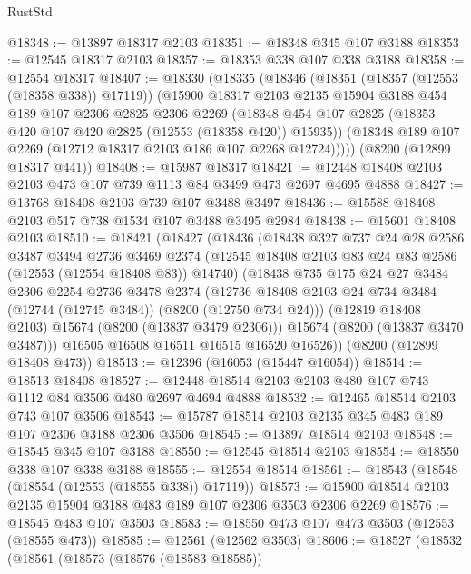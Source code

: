 \begin{lexlean}{RustStd}
\begin{coremodule}
@18348 := @13897 @18317 @2103
@18351 := @18348 @345 @107 @3188
@18353 := @12545 @18317 @2103
@18357 := @18353 @338 @107 @338 @3188
@18358 := @12554 @18317
@18407 := @18330
    (@18335
      (@18346
        (@18351 (@18357 (@12553 (@18358 @338)) @17119))
        (@15900
          @18317
          @2103
          @2135
          @15904
          @3188
          @454
          @189
          @107
          @2306
          @2825
          @2306
          @2269
          (@18348 @454 @107 @2825 (@18353 @420 @107 @420 @2825 (@12553 (@18358 @420)) @15935))
          (@18348 @189 @107 @2269 (@12712 @18317 @2103 @186 @107 @2268 @12724)))))
    (@8200 (@12899 @18317 @441))
@18408 := @15987 @18317
@18421 := @12448 @18408 @2103 @2103 @473 @107 @739 @1113 @84 @3499 @473 @2697 @4695 @4888
@18427 := @13768 @18408 @2103 @739 @107 @3488 @3497
@18436 := @15588 @18408 @2103 @517 @738 @1534 @107 @3488 @3495 @2984
@18438 := @15601 @18408 @2103
@18510 := @18421
    (@18427
      (@18436
        (@18438
          @327
          @737
          @24
          @28
          @2586
          @3487
          @3494
          @2736
          @3469
          @2374
          (@12545 @18408 @2103 @83 @24 @83 @2586 (@12553 (@12554 @18408 @83)) @14740)
          (@18438
            @735
            @175
            @24
            @27
            @3484
            @2306
            @2254
            @2736
            @3478
            @2374
            (@12736 @18408 @2103 @24 @734 @3484 (@12744 (@12745 @3484)) (@8200 (@12750 @734 @24)))
            (@12819 @18408 @2103)
            @15674
            (@8200 (@13837 @3479 @2306)))
          @15674
          (@8200 (@13837 @3470 @3487)))
        @16505
        @16508
        @16511
        @16515
        @16520
        @16526))
    (@8200 (@12899 @18408 @473))
@18513 := @12396 (@16053 (@15447 @16054))
@18514 := @18513 @18408
@18527 := @12448 @18514 @2103 @2103 @480 @107 @743 @1112 @84 @3506 @480 @2697 @4694 @4888
@18532 := @12465 @18514 @2103 @743 @107 @3506
@18543 := @15787 @18514 @2103 @2135 @345 @483 @189 @107 @2306 @3188 @2306 @3506
@18545 := @13897 @18514 @2103
@18548 := @18545 @345 @107 @3188
@18550 := @12545 @18514 @2103
@18554 := @18550 @338 @107 @338 @3188
@18555 := @12554 @18514
@18561 := @18543 (@18548 (@18554 (@12553 (@18555 @338)) @17119))
@18573 := @15900 @18514 @2103 @2135 @15904 @3188 @483 @189 @107 @2306 @3503 @2306 @2269
@18576 := @18545 @483 @107 @3503
@18583 := @18550 @473 @107 @473 @3503 (@12553 (@18555 @473))
@18585 := @12561 (@12562 @3503)
@18606 := @18527
    (@18532
      (@18561
        (@18573
          (@18576 (@18583 @18585))

\end{coremodule}
\end{lexlean}
